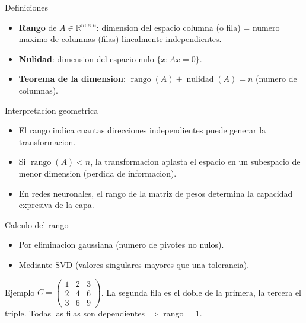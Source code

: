 \documentclass[aspectratio=169, 10pt, xcolor=table]{beamer}
\begin{document}
\begin{frame}{Definiciones}
    \begin{itemize}
        \item \textbf{Rango} de $A\in\mathbb{R}^{m\times n}$: dimension del espacio columna (o fila) = numero maximo de columnas (filas) linealmente independientes.
        \item \textbf{Nulidad}: dimension del espacio nulo $\{x: Ax=0\}$.
        \item \textbf{Teorema de la dimension}: $\operatorname{rango}(A) + \operatorname{nulidad}(A) = n$ (numero de columnas).
    \end{itemize}
\end{frame}

\begin{frame}{Interpretacion geometrica}
    \begin{itemize}
        \item El rango indica cuantas direcciones independientes puede generar la transformacion.
        \item Si $\operatorname{rango}(A) < n$, la transformacion aplasta el espacio en un subespacio de menor dimension (perdida de informacion).
        \item En redes neuronales, el rango de la matriz de pesos determina la capacidad expresiva de la capa.
    \end{itemize}
\end{frame}

\begin{frame}{Calculo del rango}
    \begin{itemize}
        \item Por eliminacion gaussiana (numero de pivotes no nulos).
        \item Mediante SVD (valores singulares mayores que una tolerancia).
    \end{itemize}
    \begin{exampleblock}{Ejemplo}
        $C = \begin{pmatrix}1&2&3\\2&4&6\\3&6&9\end{pmatrix}$. La segunda fila es el doble de la primera, la tercera el triple. Todas las filas son dependientes $\Rightarrow$ rango = 1.
    \end{exampleblock}
\end{frame}

\end{document}
